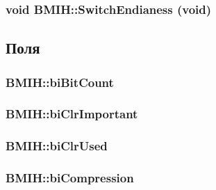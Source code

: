 \hypertarget{class_b_m_i_h_ece3c1b46fe1712b5926d0b47eb1739f}{
\subsubsection[{SwitchEndianess}]{\setlength{\rightskip}{0pt plus 5cm}void BMIH::SwitchEndianess (void)}}
\label{class_b_m_i_h_ece3c1b46fe1712b5926d0b47eb1739f}




\subsection{Поля}
\hypertarget{class_b_m_i_h_483836ab0ab74bbbadc3aaaefb3bc6ff}{
\subsubsection[{biBitCount}]{ {\bf BMIH::biBitCount}}}
\label{class_b_m_i_h_483836ab0ab74bbbadc3aaaefb3bc6ff}


\hypertarget{class_b_m_i_h_b36b35be2c0a89f215049baa7f46efb3}{
\subsubsection[{biClrImportant}]{ {\bf BMIH::biClrImportant}}}
\label{class_b_m_i_h_b36b35be2c0a89f215049baa7f46efb3}


\hypertarget{class_b_m_i_h_92a19ff093c553a393d53d0a3bd6c5e7}{
\subsubsection[{biClrUsed}]{ {\bf BMIH::biClrUsed}}}
\label{class_b_m_i_h_92a19ff093c553a393d53d0a3bd6c5e7}


\hypertarget{class_b_m_i_h_e8082e74c08c30be9ece489b51989a36}{
\subsubsection[{biCompression}]{ {\bf BMIH::biCompression}}}
\label{class_b_m_i_h_e8082e74c08c30be9ece489b51989a36}


